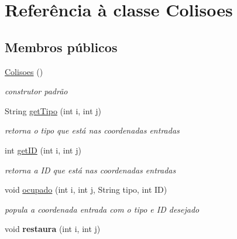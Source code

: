 \hypertarget{class_colisoes}{}\section{Referência à classe Colisoes}
\label{class_colisoes}
\subsection*{Membros públicos}
\begin{DoxyCompactItemize}
\item 
\mbox{\hyperlink{class_colisoes_a8a51b610e7e5d3a011b5c790429dc598}{Colisoes}} ()
\begin{DoxyCompactList}\small\item\em construtor padrão \end{DoxyCompactList}\item 
\mbox{\label{class_colisoes_a12b4feebe3aceaf64b6a20941677d31f}} 
String \mbox{\hyperlink{class_colisoes_a12b4feebe3aceaf64b6a20941677d31f}{get\+Tipo}} (int i, int j)
\begin{DoxyCompactList}\small\item\em retorna o tipo que está nas coordenadas entradas \end{DoxyCompactList}\item 
\mbox{\label{class_colisoes_a2a5dc91b1a181819919be8726272293a}} 
int \mbox{\hyperlink{class_colisoes_a2a5dc91b1a181819919be8726272293a}{get\+ID}} (int i, int j)
\begin{DoxyCompactList}\small\item\em retorna a ID que está nas coordenadas entradas \end{DoxyCompactList}\item 
\mbox{\label{class_colisoes_aee76e39346a03b3f6eeddbca2efe8067}} 
void \mbox{\hyperlink{class_colisoes_aee76e39346a03b3f6eeddbca2efe8067}{ocupado}} (int i, int j, String tipo, int ID)
\begin{DoxyCompactList}\small\item\em popula a coordenada entrada com o tipo e ID desejado \end{DoxyCompactList}\item 
\mbox{\label{class_colisoes_ad901b8e1997c5166cf91e1571fc8a9b9}} 
void {\bfseries restaura} (int i, int j)
\end{DoxyCompactItemize}
